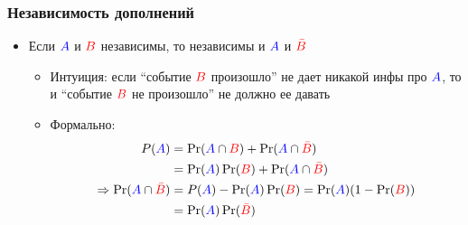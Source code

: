 \documentclass[hyperref=unicode,graphics=pdflatex,13pt,xcolor={usenames,dvipsnames}]{beamer}
\newcommand\hl[1]{{\color{blue}{#1}}}
\newcommand\red[1]{{\color{red}{#1}}}
\newcommand\pitem{\pause\item}
\begin{document}
\begin{frame}
  \frametitle{Независимость дополнений}
  \begin{itemize}
    \item Если $\hl{A}$ и $\red{B}$ независимы, то независимы и $\hl{A}$ и $\red{\bar B}$
    \begin{itemize}
      \pitem Интуиция: если ``событие $\red{B}$ произошло'' не дает никакой инфы про $\hl{A}$, то и ``событие $\red{B}$ не произошло'' не должно ее давать
      \pitem Формально:
      \begin{align*}
        P(\hl{A}) &= \Pr(\hl{A} \cap \red{B}) + \Pr(\hl{A} \cap \red{\bar B}) \\
                  &= \Pr(\hl{A})\Pr(\red{B}) + \Pr(\hl{A} \cap \red{\bar B}) \\
        \Rightarrow \Pr(\hl{A} \cap \red{\bar B}) &= P(\hl{A}) - \Pr(\hl{A})\Pr(\red{B}) = \Pr(\hl{A})(1 - \Pr(\red{B})) \\
                  &= \Pr(\hl{A}) \Pr(\red{\bar B})
      \end{align*}
    \end{itemize}
  \end{itemize}
\end{frame}
\end{document}
